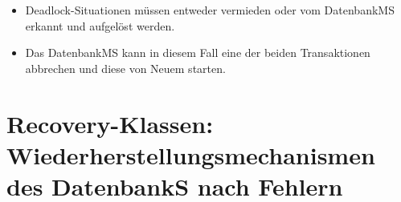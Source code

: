 \documentclass{bschlangaul-theorie}
\begin{document}
\begin{itemize}
\item Deadlock-Situationen müssen entweder vermieden oder vom DatenbankMS
erkannt und aufgelöst werden.

\item Das DatenbankMS kann in diesem Fall eine der beiden Transaktionen
abbrechen und diese von Neuem starten.
\end{itemize}

%

\section{Recovery-Klassen: Wiederherstellungsmechanismen des DatenbankS nach
Fehlern}
\end{document}
